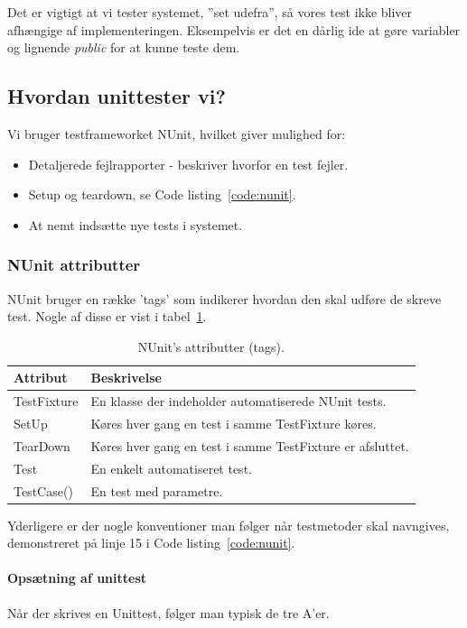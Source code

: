 Det er vigtigt at vi tester systemet, ''set udefra'', så vores test ikke bliver afhængige af implementeringen. Eksempelvis er det en dårlig ide at gøre variabler og lignende \textit{public} for at kunne teste dem.

\subsection{Hvordan unittester vi?}
Vi bruger testframeworket NUnit, hvilket giver mulighed for:

\begin{itemize}
	\item Detaljerede fejlrapporter - beskriver hvorfor en test fejler.
	\item Setup og teardown, se Code listing~\ref{code:nunit}.
	\item At nemt indsætte nye tests i systemet.
\end{itemize}

\subsubsection{NUnit attributter}
NUnit bruger en række 'tags' som indikerer hvordan den skal udføre de skreve test. Nogle af disse er vist i tabel~\ref{tab:nunit}.

\begin{table}[H]
	\centering
	\begin{tabular}{ll}
		\toprule
		\textbf{Attribut}& 	\textbf{Beskrivelse}\\ \midrule
		TestFixture	&	En klasse der indeholder automatiserede NUnit tests. \\
		SetUp		&	Køres hver gang en test i samme TestFixture køres.\\
		TearDown	&	Køres hver gang en test i samme TestFixture er afsluttet.\\
		Test		&	En enkelt automatiseret test.\\
		TestCase()	&	En test med parametre.\\ \bottomrule
	\end{tabular}
	\caption{NUnit's attributter (tags).}
	\label{tab:nunit}
\end{table}

Yderligere er der nogle konventioner man følger når testmetoder skal navngives, demonstreret på linje 15 i Code listing~\ref{code:nunit}.

\paragraph{Opsætning af unittest} Når der skrives en Unittest, følger man typisk de tre A'er.

